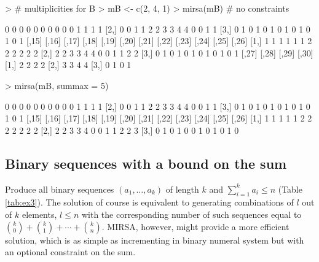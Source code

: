 \documentclass[12pt]{article}
\begin{document}
\begin{Schunk}
\begin{Sinput}
> # multiplicities for B
> mB <- c(2, 4, 1)
> mirsa(mB)                # no constraints
\end{Sinput}
\begin{Soutput}
     [,1] [,2] [,3] [,4] [,5] [,6] [,7] [,8] [,9] [,10] [,11] [,12] [,13] [,14]
[1,]    0    0    0    0    0    0    0    0    0     0     1     1     1     1
[2,]    0    0    1    1    2    2    3    3    4     4     0     0     1     1
[3,]    0    1    0    1    0    1    0    1    0     1     0     1     0     1
     [,15] [,16] [,17] [,18] [,19] [,20] [,21] [,22] [,23] [,24] [,25] [,26]
[1,]     1     1     1     1     1     1     2     2     2     2     2     2
[2,]     2     2     3     3     4     4     0     0     1     1     2     2
[3,]     0     1     0     1     0     1     0     1     0     1     0     1
     [,27] [,28] [,29] [,30]
[1,]     2     2     2     2
[2,]     3     3     4     4
[3,]     0     1     0     1
\end{Soutput}
\begin{Sinput}
> mirsa(mB, summax = 5)
\end{Sinput}
\begin{Soutput}
     [,1] [,2] [,3] [,4] [,5] [,6] [,7] [,8] [,9] [,10] [,11] [,12] [,13] [,14]
[1,]    0    0    0    0    0    0    0    0    0     0     1     1     1     1
[2,]    0    0    1    1    2    2    3    3    4     4     0     0     1     1
[3,]    0    1    0    1    0    1    0    1    0     1     0     1     0     1
     [,15] [,16] [,17] [,18] [,19] [,20] [,21] [,22] [,23] [,24] [,25] [,26]
[1,]     1     1     1     1     1     2     2     2     2     2     2     2
[2,]     2     2     3     3     4     0     0     1     1     2     2     3
[3,]     0     1     0     1     0     0     1     0     1     0     1     0
\end{Soutput}
\end{Schunk}

\subsection{Binary sequences with a bound on the sum}   

Produce all binary sequences $(a_1, \dotsc, a_k)$ of length $k$ and $\sum_{i = 1}^k a_i \leqslant n$ (Table \ref{tab:ex3}). The solution of course is equivalent to generating combinations of $l$ out of $k$ elements, $l \leqslant n$ with the corresponding number of such sequences equal to $\binom{k}{0} + \binom{k}{1} + \dotsb + \binom{k}{n}$. MIRSA, however, might provide a more efficient solution, which is as simple as incrementing in binary numeral system but with an optional constraint on the sum.
\end{document}
